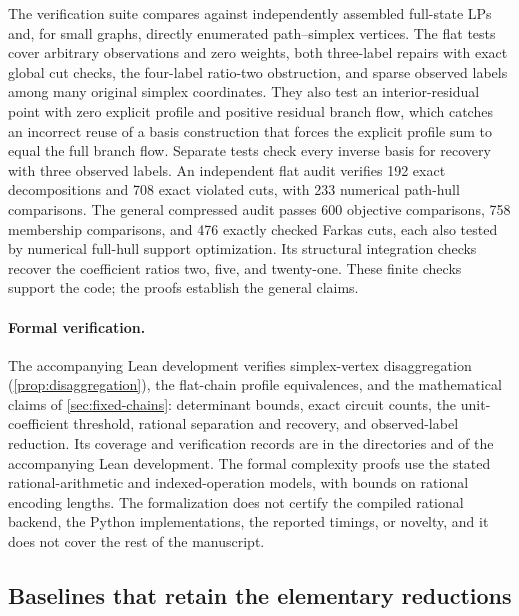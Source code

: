 The verification suite compares against independently assembled full-state
LPs and, for small graphs, directly enumerated path--simplex vertices.
The flat tests cover arbitrary observations and zero weights, both
three-label repairs with exact global cut checks, the four-label ratio-two
obstruction, and sparse observed labels among many original simplex
coordinates. They also test an interior-residual point with zero explicit
profile and positive residual branch flow, which catches an incorrect reuse
of a basis construction that forces the explicit profile sum to equal the
full branch flow. Separate tests check every inverse basis for recovery
with three observed labels. An independent flat audit verifies 192 exact
decompositions and 708 exact violated cuts, with 233 numerical path-hull
comparisons. The general compressed audit passes 600 objective comparisons,
758 membership comparisons, and 476 exactly checked Farkas cuts, each also
tested by numerical full-hull support optimization. Its structural
integration checks recover the coefficient ratios two, five, and
twenty-one. These finite checks support the code; the proofs establish
the general claims.

\paragraph{Formal verification.}
The accompanying Lean development verifies simplex-vertex disaggregation
(\cref{prop:disaggregation}), the flat-chain profile equivalences, and the
mathematical claims of \cref{sec:fixed-chains}: determinant bounds, exact
circuit counts, the unit-coefficient threshold, rational separation and
recovery, and observed-label reduction. Its coverage and verification
records are in the directories  and
 of the accompanying Lean
development. The formal complexity proofs
use the stated rational-arithmetic and indexed-operation models, with
bounds on rational encoding lengths. The formalization does not certify the
compiled rational backend, the Python implementations, the reported
timings, or novelty, and it does not cover the rest of the manuscript.

\subsection{Baselines that retain the elementary reductions}

